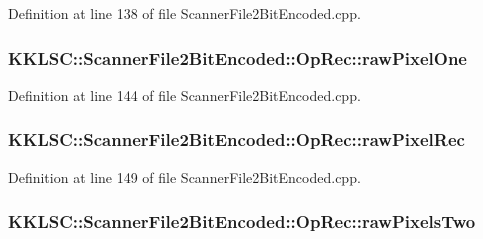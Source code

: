 Definition at line 138 of file Scanner\+File2\+Bit\+Encoded.\+cpp.

\subsubsection[{\texorpdfstring{raw\+Pixel\+One}{rawPixelOne}}]{ K\+K\+L\+S\+C\+::\+Scanner\+File2\+Bit\+Encoded\+::\+Op\+Rec\+::raw\+Pixel\+One}\hypertarget{union_scanner_file2_bit_encoded_1_1_op_rec_ac58f69139f0ffc319da6dcd6ee8f9531}{}\label{union_scanner_file2_bit_encoded_1_1_op_rec_ac58f69139f0ffc319da6dcd6ee8f9531}


Definition at line 144 of file Scanner\+File2\+Bit\+Encoded.\+cpp.

\subsubsection[{\texorpdfstring{raw\+Pixel\+Rec}{rawPixelRec}}]{ K\+K\+L\+S\+C\+::\+Scanner\+File2\+Bit\+Encoded\+::\+Op\+Rec\+::raw\+Pixel\+Rec}\hypertarget{union_scanner_file2_bit_encoded_1_1_op_rec_ac8cbe5c044e1fda7986f35569f489a3d}{}\label{union_scanner_file2_bit_encoded_1_1_op_rec_ac8cbe5c044e1fda7986f35569f489a3d}


Definition at line 149 of file Scanner\+File2\+Bit\+Encoded.\+cpp.

\subsubsection[{\texorpdfstring{raw\+Pixels\+Two}{rawPixelsTwo}}]{ K\+K\+L\+S\+C\+::\+Scanner\+File2\+Bit\+Encoded\+::\+Op\+Rec\+::raw\+Pixels\+Two}\hypertarget{union_scanner_file2_bit_encoded_1_1_op_rec_acaf907b6739335ba2abd174fc071318a}{}\label{union_scanner_file2_bit_encoded_1_1_op_rec_acaf907b6739335ba2abd174fc071318a}


